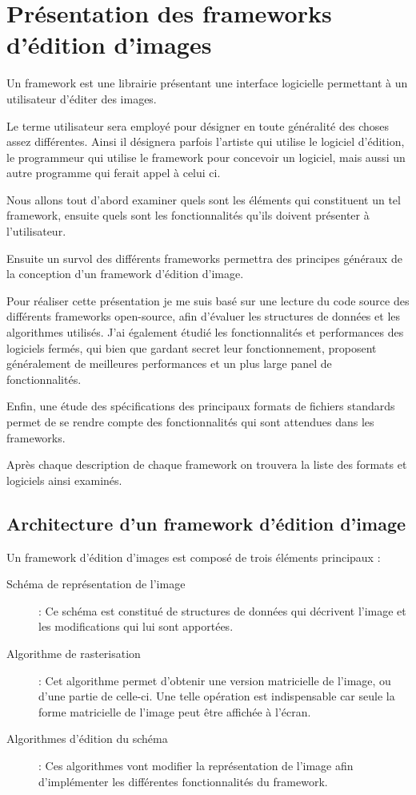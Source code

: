 	
\chapter{Présentation des frameworks d'édition d'images}
	

	Un framework est une librairie présentant une interface logicielle permettant à un utilisateur d'éditer des images. 
	
	Le terme utilisateur sera employé pour désigner en toute généralité des choses assez différentes. Ainsi il désignera parfois 
	l'artiste qui utilise le logiciel d'édition, le programmeur qui utilise le framework pour
	concevoir un logiciel, mais aussi un autre programme qui ferait appel à celui ci.  

	Nous allons tout d'abord examiner quels sont les éléments qui constituent un tel framework, ensuite quels sont
	les fonctionnalités qu'ils doivent présenter à l'utilisateur. 

	Ensuite un survol des différents frameworks permettra des principes généraux de la conception d'un framework d'édition d'image.
	
	Pour réaliser cette présentation je me suis basé sur une lecture du code source des différents frameworks open-source, afin d'évaluer
	les structures de données et les algorithmes utilisés. J'ai également étudié les fonctionnalités et performances des logiciels fermés,
	qui bien que gardant secret leur fonctionnement, proposent généralement de meilleures performances et un plus large panel de fonctionnalités.
	
	Enfin, une étude des spécifications des principaux formats de fichiers standards permet de se rendre compte des fonctionnalités qui sont 
	attendues dans les frameworks. 

	Après chaque description de chaque framework on trouvera la liste des formats et logiciels ainsi examinés.

	\section{Architecture d'un framework d'édition d'image}
		Un framework d'édition d'images est composé de trois éléments principaux : 
		\begin{description}
			\item[Schéma de représentation de l'image]: Ce schéma est constitué de structures de données qui 
			décrivent l'image et les modifications qui lui sont apportées. 
			\item[Algorithme de rasterisation]: Cet algorithme permet d'obtenir une version matricielle de l'image,
			ou d'une partie de celle-ci. Une telle opération est indispensable car seule la forme matricielle de l'image
			peut être affichée à l'écran.
			\item[Algorithmes d'édition du schéma]: Ces algorithmes vont modifier la représen\-tation de l'image afin 
			d'implémenter les différentes fonctionnalités du framework.
		\end{description}

